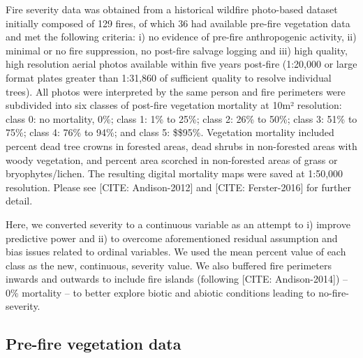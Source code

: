 \documentclass[
  numafflabel,
  authoryear,
  preprint]{elsarticle}
\begin{document}
Fire severity data was obtained from a historical wildfire photo-based
dataset initially composed of 129 fires, of which 36 had available
pre-fire vegetation data and met the following criteria: i) no evidence
of pre-fire anthropogenic activity, ii) minimal or no fire suppression,
no post-fire salvage logging and iii) high quality, high resolution
aerial photos available within five years post-fire (1:20,000 or large
format plates greater than 1:31,860 of sufficient quality to resolve
individual trees). All photos were interpreted by the same person and
fire perimeters were subdivided into six classes of post-fire vegetation
mortality at 10m² resolution: class 0: no mortality, 0\%; class 1: 1\%
to 25\%; class 2: 26\% to 50\%; class 3: 51\% to 75\%; class 4: 76\% to
94\%; and class 5: \$\geq\$95\%. Vegetation mortality included percent
dead tree crowns in forested areas, dead shrubs in non-forested areas
with woody vegetation, and percent area scorched in non-forested areas
of grass or bryophytes/lichen. The resulting digital mortality maps were
saved at 1:50,000 resolution. Please see {[}CITE: Andison-2012{]} and
{[}CITE: Ferster-2016{]} for further detail.

Here, we converted severity to a continuous variable as an attempt to i)
improve predictive power and ii) to overcome aforementioned residual
assumption and bias issues related to ordinal variables. We used the
mean percent value of each class as the new, continuous, severity value.
We also buffered fire perimeters inwards and outwards to include fire
islands (following {[}CITE: Andison-2014{]}) -- 0\% mortality -- to
better explore biotic and abiotic conditions leading to
no-fire-severity.

\subsection{Pre-fire vegetation data}\label{pre-fire-vegetation-data}
\end{document}
